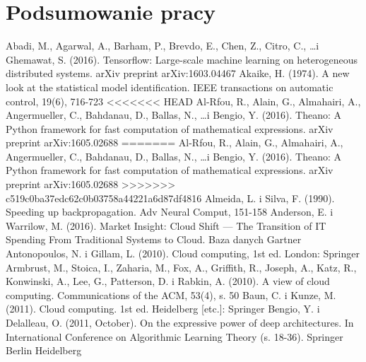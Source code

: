 \documentclass[12pt,a4paper,twoside]{article}
\begin{document}
\clearpage

\section{Podsumowanie pracy}

\clearpage

\begin{thebibliography}{99}
\setlength{\itemsep}{0pt}%
 Abadi, M., Agarwal, A., Barham, P., Brevdo, E., Chen, Z., Citro, C., \ldots i Ghemawat, S. (2016). Tensorflow: Large-scale machine learning on heterogeneous distributed systems. arXiv preprint arXiv:1603.04467
 Akaike, H. (1974). A new look at the statistical model identification. IEEE transactions on automatic control, 19(6), 716-723
<<<<<<< HEAD
 Al-Rfou, R., Alain, G., Almahairi, A., Angermueller, C., Bahdanau, D., Ballas, N., \ldots i Bengio, Y. (2016). Theano: A Python framework for fast computation of mathematical expressions. arXiv preprint arXiv:1605.02688
=======
 Al-Rfou, R., Alain, G., Almahairi, A., Angermueller, C., Bahdanau, D., Ballas, N., \ldots i Bengio, Y. (2016). Theano: A Python framework for fast computation of mathematical expressions. arXiv preprint arXiv:1605.02688
>>>>>>> c519c0ba37edc62c0b03758a44221a6d87df4816
 Almeida, L. i Silva, F. (1990). Speeding up backpropagation. Adv Neural Comput, 151-158
 Anderson, E. i Warrilow, M. (2016). Market Insight: Cloud Shift — The Transition of IT Spending From Traditional Systems to Cloud. Baza danych Gartner
 Antonopoulos, N. i Gillam, L. (2010). Cloud computing, 1st ed. London: Springer
 Armbrust, M., Stoica, I., Zaharia, M., Fox, A., Griffith, R., Joseph, A., Katz, R., Konwinski, A., Lee, G., Patterson, D. i Rabkin, A. (2010). A view of cloud computing. Communications of the ACM, 53(4), s. 50
 Baun, C. i Kunze, M. (2011). Cloud computing. 1st ed. Heidelberg [etc.]: Springer
 Bengio, Y. i Delalleau, O. (2011, October). On the expressive power of deep architectures. In International Conference on Algorithmic Learning Theory (s. 18-36). Springer Berlin Heidelberg

\end{thebibliography}
\end{document}
